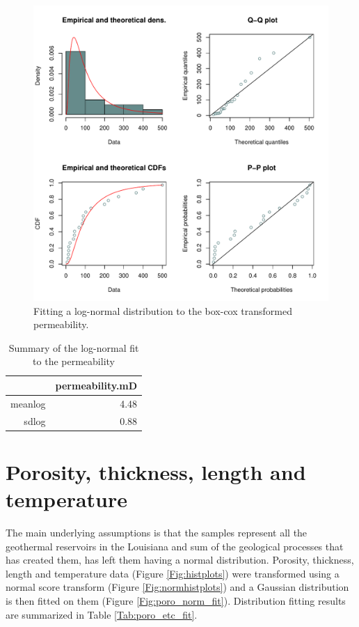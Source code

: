 \documentclass[review,authoryear, 12pt]{elsarticle}\usepackage[]{graphicx}\usepackage[]{color}
\makeatletter
\def\maxwidth{ %
  \ifdim\Gin@nat@width>\linewidth
    \linewidth
  \else
    \Gin@nat@width
  \fi
}
\newenvironment{knitrout}{}{} %
\makeatother
\begin{document}
\begin{knitrout}
\color{fgcolor}\begin{figure}[]

\includegraphics[width=\maxwidth]{figure/perm_fit} \caption[Fitting a log-normal distribution to the box-cox transformed permeability]{Fitting a log-normal distribution to the box-cox transformed permeability.\label{Fig:perm_fit}}
\end{figure}


\end{knitrout}


\begin{table}[ht]
\centering
\begin{tabular}{rr}
  \hline
 & permeability.mD \\ 
  \hline
meanlog & 4.48 \\ 
  sdlog & 0.88 \\ 
   \hline
\end{tabular}
\caption{{Summary of the log-normal fit to the permeability}} 
\label{Tab:Permfit}
\end{table}


\pagebreak


\section{Porosity, thickness, length and temperature}
The main underlying assumptions is that the samples represent all the geothermal reservoirs in the Louisiana and sum of the geological processes that has created them, has left them having a normal distribution. Porosity, thickness, length and temperature data (Figure \ref{Fig:histplots}) were transformed using a normal score transform (Figure \ref{Fig:normhistplots}) and a Gaussian distribution is then fitted on them (Figure \ref{Fig:poro_norm_fit}). Distribution fitting results are summarized in Table \ref{Tab:poro_etc_fit}.
\end{document}

